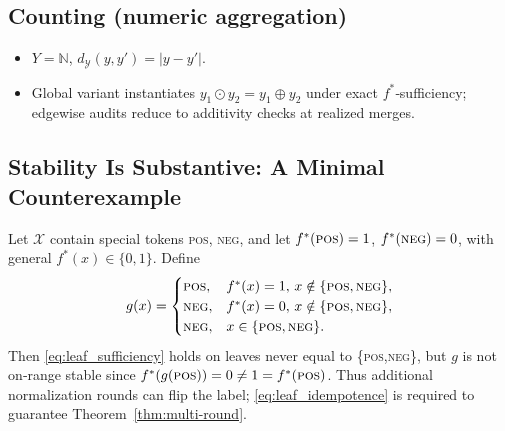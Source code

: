 \documentclass[11pt]{article}
\newcommand{\Strings}{\mathcal{X}}       %
\newcommand{\Y}{\mathcal{Y}}               %
\newcommand{\fstar}{f^*}               %
\newcommand{\concat}{\oplus}                    %
\newcommand{\metric}{d_{\Y}}
\begin{document}
\subsection{Counting (numeric aggregation)}
\begin{itemize}
  \item $Y=\mathbb N$, $\metric(y,y')=|y-y'|$.
  \item Global variant instantiates $y_1\odot y_2=y_1\concat y_2$ under exact $\fstar$‑sufficiency; edgewise audits reduce to additivity checks at realized merges.
\end{itemize}

\subsection{Stability Is Substantive: A Minimal Counterexample}
\label{app:stability}

Let $\Strings$ contain special tokens \textsc{pos}, \textsc{neg}, and let $\fstar(\textsc{pos})=1$, $\fstar(\textsc{neg})=0$, with general $\fstar(x)\in\{0,1\}$. Define
\[
g(x)=
\begin{cases}
\textsc{pos},& \fstar(x)=1,\,x\notin\{\textsc{pos},\textsc{neg}\},\\
\textsc{neg},& \fstar(x)=0,\,x\notin\{\textsc{pos},\textsc{neg}\},\\
\textsc{neg},& x\in\{\textsc{pos},\textsc{neg}\}.
\end{cases}
\]
Then \ref{eq:leaf_sufficiency} holds on leaves never equal to \{\textsc{pos},\textsc{neg}\}, but $g$ is not on‑range stable since $\fstar(g(\textsc{pos}))=0\neq 1=\fstar(\textsc{pos})$. Thus additional normalization rounds can flip the label; \ref{eq:leaf_idempotence} is required to guarantee Theorem~\ref{thm:multi-round}.
\end{document}

